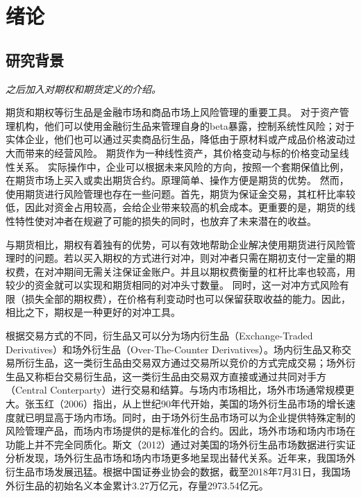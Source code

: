 
\chapter{绪论}
\label{chap:intro}

\section{研究背景}

\emph{之后加入对期权和期货定义的介绍。}

期货和期权等衍生品是金融市场和商品市场上风险管理的重要工具。
对于资产管理机构，他们可以使用金融衍生品来管理自身的beta暴露，控制系统性风险；对于实体企业，他们也可以通过买卖商品衍生品，降低由于原材料或产成品价格波动过大而带来的经营风险。
期货作为一种线性资产，其价格变动与标的价格变动呈线性关系。
实际操作中，企业可以根据未来风险的方向，按照一个套期保值比例，在期货市场上买入或卖出期货合约。原理简单、操作方便是期货的优势。
然而，使用期货进行风险管理也存在一些问题。首先，期货为保证金交易，其杠杆比率较低，因此对资金占用较高，会给企业带来较高的机会成本。更重要的是，期货的线性特性使对冲者在规避了可能的损失的同时，也放弃了未来潜在的收益。\cite{Meta_CN}

与期货相比，期权有着独有的优势，可以有效地帮助企业解决使用期货进行风险管理时的问题。若以买入期权的方式进行对冲，则对冲者只需在期初支付一定量的期权费，在对冲期间无需关注保证金账户。并且以期权费衡量的杠杆比率也较高，用较少的资金就可以实现和期货相同的对冲头寸数量。
同时，这一对冲方式风险有限（损失全部的期权费），在价格有利变动时也可以保留获取收益的能力。因此，相比之下，期权是一种更好的对冲工具。

根据交易方式的不同，衍生品又可以分为场内衍生品（Exchange-Traded Derivatives）和场外衍生品（Over-The-Counter Derivatives）。场内衍生品又称交易所衍生品，这一类衍生品由交易双方通过交易所以竞价的方式完成交易；场外衍生品又称柜台交易衍生品，这一类衍生品由交易双方直接或通过共同对手方（Central Conterparty）进行交易和结算。与场内市场相比，场外市场通常规模更大。张玉红（2006）指出，从上世纪90年代开始，美国的场外衍生品市场的增长速度就已明显高于场内市场。同时，由于场外衍生品市场可以为企业提供特殊定制的风险管理产品，而场内市场提供的是标准化的合约。因此，场外市场和场内市场在功能上并不完全同质化。斯文（2012）通过对美国的场外衍生品市场数据进行实证分析发现，场外衍生品市场和场内市场更多地呈现出替代关系。近年来，我国场外衍生品市场发展迅猛。根据中国证券业协会的数据，截至2018年7月31日，我国场外衍生品的初始名义本金累计3.27万亿元，存量2973.54亿元。

